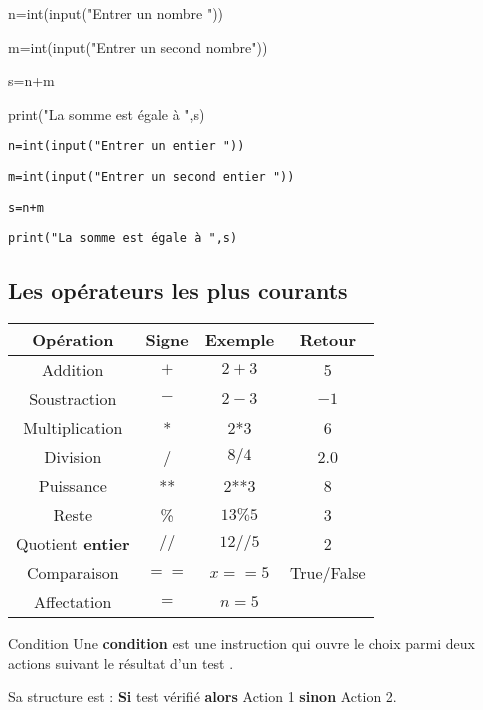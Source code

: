 \begin{minipage}[]{0.49\linewidth}
\begin{Ex}
n={\color{violet}int}({\color{violet}input}({\color{vert}"Entrer un nombre "}))

m={\color{violet}int}({\color{violet}input}({\color{vert}"Entrer un second nombre"}))

s=n+m

{\color{violet}print}({\color{vert}"La somme est égale à "},s)
\end{Ex}

\begin{Cod}
\texttt{n={\color{violet}int}({\color{violet}input}({\color{vert}"Entrer un entier "}))}

\texttt{m={\color{violet}int}({\color{violet}input}({\color{vert}"Entrer un second entier "}))}

\texttt{s=n+m}

\texttt{{\color{violet}print}({\color{vert}"La somme est égale à "},s)}

\end{Cod}
\end{minipage} 
\hfill
\begin{minipage}[]{0.49\linewidth}
\subsection*{Les opérateurs les plus courants}


\begin{tabular}{|c|c|c|c|}
\hline 
Opération& Signe & Exemple & Retour \\
\hline 
Addition & $+$ & $2+3$ & 5\\ 
\hline 
Soustraction & $-$ & $2-3$ & $-1$ \\ 
\hline 
Multiplication & * & 2*3&6 \\ 
\hline 
Division & / & $8/4$ & 2.0\\ 
\hline 
Puissance & ** & 2**3 & 8 \\ 
\hline 
Reste & \% & $13\%5$ & 3 \\ 
\hline 
Quotient \textbf{entier}  & $//$ & $12//5$ & 2 \\ 
\hline 
Comparaison   & $==$ & $x==5$ & {\color{orange}True}/{\color{orange}False} \\ 
\hline 
Affectation   & $=$ & $n=5$ &  \\ 
\hline 
\end{tabular} 
\end{minipage} 

\begin{DefT}{Condition}
Une \textbf{condition}  est une instruction qui ouvre le choix parmi deux actions suivant le résultat d'un test .

Sa structure est : \textbf{Si} test vérifié \textbf{alors} Action 1 \textbf{sinon} Action 2.
\end{DefT}

